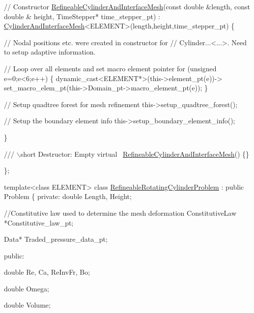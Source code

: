 \begin{DoxyCodeInclude}
 \textcolor{comment}{// Constructor}
 \hyperlink{classRefineableCylinderAndInterfaceMesh}{RefineableCylinderAndInterfaceMesh}(\textcolor{keyword}{const} \textcolor{keywordtype}{double} &length, \textcolor{keyword}{const} \textcolor{keywordtype}{double} &
      height,
                                    TimeStepper* time\_stepper\_pt) :
  \hyperlink{classCylinderAndInterfaceMesh}{CylinderAndInterfaceMesh}<ELEMENT>(length,height,time\_stepper\_pt) 
  \{

   \textcolor{comment}{// Nodal positions etc. were created in constructor for}
   \textcolor{comment}{// Cylinder...<...>. Need to setup adaptive information.}

   \textcolor{comment}{// Loop over all elements and set macro element pointer}
   \textcolor{keywordflow}{for} (\textcolor{keywordtype}{unsigned} e=0;e<6;e++)
    \{
     \textcolor{keyword}{dynamic\_cast<}ELEMENT*\textcolor{keyword}{>}(this->element\_pt(e))->
      set\_macro\_elem\_pt(this->Domain\_pt->macro\_element\_pt(e));
    \}

   \textcolor{comment}{// Setup quadtree forest for mesh refinement}
   this->setup\_quadtree\_forest();
   
   \textcolor{comment}{// Setup the boundary element info}
   this->setup\_boundary\_element\_info();

  \}

 \textcolor{comment}{}
\textcolor{comment}{ /// \(\backslash\)short Destructor: Empty}
\textcolor{comment}{} \textcolor{keyword}{virtual} ~\hyperlink{classRefineableCylinderAndInterfaceMesh}{RefineableCylinderAndInterfaceMesh}() \{\}


\};

\textcolor{keyword}{template}<\textcolor{keyword}{class} ELEMENT>
\textcolor{keyword}{class }\hyperlink{classRefineableRotatingCylinderProblem}{RefineableRotatingCylinderProblem} : \textcolor{keyword}{public} Problem
\{
\textcolor{keyword}{private}:
 \textcolor{keywordtype}{double} Length, Height;
 
 \textcolor{comment}{//Constitutive law used to determine the mesh deformation}
 ConstitutiveLaw *Constitutive\_law\_pt;

 Data* Traded\_pressure\_data\_pt;

\textcolor{keyword}{public}:

 \textcolor{keywordtype}{double} Re, Ca, ReInvFr, Bo;

 \textcolor{keywordtype}{double} Omega;
 
 \textcolor{keywordtype}{double} Volume;


\end{DoxyCodeInclude}
